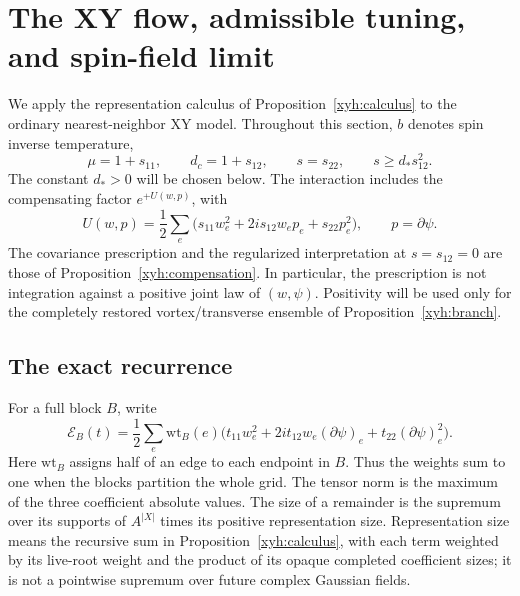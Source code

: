 \section{The XY flow, admissible tuning, and spin-field limit}
\label{xyf:section}

We apply the representation calculus of Proposition~\ref{xyh:calculus}
to the ordinary nearest-neighbor XY model.  Throughout this section,
\(b\) denotes spin inverse temperature,
\[
 \mu=1+s_{11},\qquad d_c=1+s_{12},\qquad s=s_{22},
 \qquad s\ge d_*s_{12}^2.
\]
The constant \(d_*>0\) will be chosen below.  The interaction includes
the compensating factor \(e^{+U(w,p)}\), with
\[
 U(w,p)=\frac12\sum_e
  \bigl(s_{11}w_e^2+2i s_{12}w_ep_e+s_{22}p_e^2\bigr),
 \qquad p=\partial\psi.
\]
The covariance prescription and the regularized interpretation at
\(s=s_{12}=0\) are those of Proposition~\ref{xyh:compensation}.
In particular, the prescription is not integration against a positive
joint law of \((w,\psi)\).  Positivity will be used only for the completely
restored vortex/transverse ensemble of Proposition~\ref{xyh:branch}.

\subsection{The exact recurrence}

For a full block \(B\), write
\begin{equation}
 \mathcal E_B(t)=\frac12\sum_e\mathrm{wt}_B(e)
 \bigl(t_{11}w_e^2+2i t_{12}w_e(\partial\psi)_e
                  +t_{22}(\partial\psi)_e^2\bigr).
 \label{xyf:tensor}
\end{equation}
Here \(\mathrm{wt}_B\) assigns half of an edge to each endpoint in \(B\).
Thus the weights sum to one when the blocks partition the whole grid.
The tensor norm is the maximum of the three coefficient absolute values.
The size of a remainder is the supremum over its supports of
\(A^{|X|}\) times its positive representation size.  Representation size
means the recursive sum in Proposition~\ref{xyh:calculus}, with each term
weighted by its live-root weight and the product of its opaque completed
coefficient sizes;
it is not a pointwise supremum over future complex Gaussian fields.


